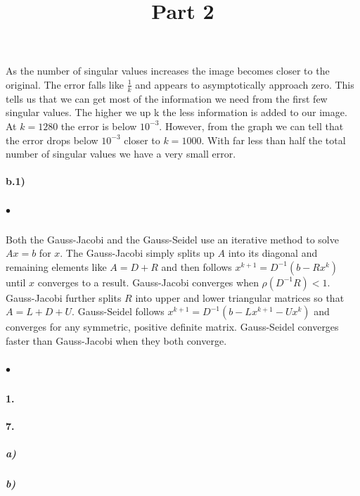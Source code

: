\documentclass[12pt]{article}
\begin{document}
		As the number of singular values increases the image becomes closer to the original. The error falls like $\frac{1}{k}$ and appears to asymptotically approach zero. This tells us that we can get most of the information we need from the first few singular values. The higher we up k the less information is added to our image. At $k = 1280$ the error is below $10^{-3}$. However, from the graph we can tell that the error drops below $10^{-3}$ closer to $k = 1000$. With far less than half the total number of singular values we have a very small error.
	
\paragraph{b.1)}
	\subparagraph{$\bullet$}
		Both the Gauss-Jacobi and the Gauss-Seidel use an iterative method to solve $Ax = b$ for $x$. The Gauss-Jacobi simply splits up $A$ into its diagonal and remaining elements like $A = D + R$ and then follows $x^{k+1} = D^{-1}(b - Rx^k)$ until $x$ converges to a result. Gauss-Jacobi converges when $\rho(D^{-1}R) < 1$. Gauss-Jacobi further splits $R$ into upper and lower triangular matrices so that $A = L + D + U$. Gauss-Seidel follows $x^{k+1} = D^{-1}(b - Lx^{k+1} - Ux^{k})$ and converges for any symmetric, positive definite matrix. Gauss-Seidel converges faster than Gauss-Jacobi when they both converge. 
		
	\subparagraph{$\bullet$}	

	
\newpage	
\title{\textbf{Part 2}}

\paragraph{1.}

	
\paragraph{7.}
	\subparagraph{a)}

	
	\subparagraph{b)}
	
	
\end{document}
